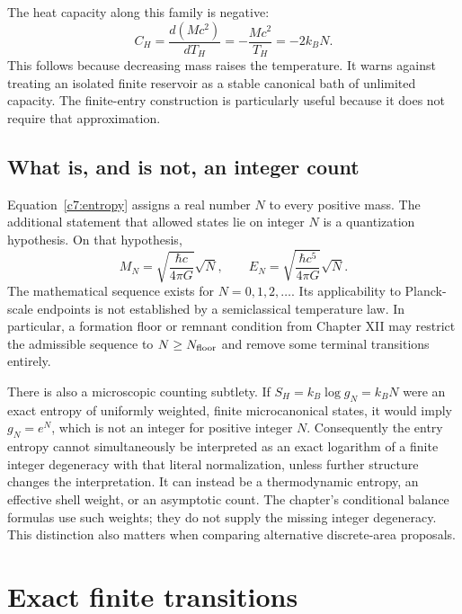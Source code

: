 The heat capacity along this family is negative:
\begin{equation}
 C_H=\frac{d(Mc^2)}{dT_H}
 =-\frac{Mc^2}{T_H}=-2k_BN.
 \label{c7:heatcapacity}
\end{equation}
This follows because decreasing mass raises the temperature. It warns against treating an isolated finite reservoir as a stable canonical bath of unlimited capacity. The finite-entry construction is particularly useful because it does not require that approximation.

\subsection{What is, and is not, an integer count}
Equation~\eqref{c7:entropy} assigns a real number $N$ to every positive mass. The additional statement that allowed states lie on integer $N$ is a quantization hypothesis. On that hypothesis,
\begin{equation}
 M_N=\sqrt{\frac{\hbar c}{4\pi G}}\sqrt N,
 \qquad E_N=\sqrt{\frac{\hbar c^5}{4\pi G}}\sqrt N.
 \label{c7:levels}
\end{equation}
The mathematical sequence exists for $N=0,1,2,\ldots$. Its applicability to Planck-scale endpoints is not established by a semiclassical temperature law. In particular, a formation floor or remnant condition from Chapter XII may restrict the admissible sequence to $N\ge N_{\rm floor}$ and remove some terminal transitions entirely.

There is also a microscopic counting subtlety. If $S_H=k_B\log g_N=k_BN$ were an exact entropy of uniformly weighted, finite microcanonical states, it would imply $g_N=e^N$, which is not an integer for positive integer $N$. Consequently the entry entropy cannot simultaneously be interpreted as an exact logarithm of a finite integer degeneracy with that literal normalization, unless further structure changes the interpretation. It can instead be a thermodynamic entropy, an effective shell weight, or an asymptotic count. The chapter's conditional balance formulas use such weights; they do not supply the missing integer degeneracy. This distinction also matters when comparing alternative discrete-area proposals.

\section{Exact finite transitions}
